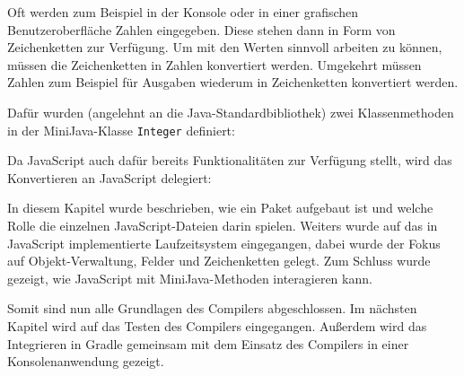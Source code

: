 Oft werden zum Beispiel in der Konsole oder in einer grafischen Benutzeroberfläche Zahlen eingegeben. Diese stehen dann in Form von Zeichenketten zur Verfügung. Um mit den Werten sinnvoll arbeiten zu können, müssen die Zeichenketten in Zahlen konvertiert werden. Umgekehrt müssen Zahlen zum Beispiel für Ausgaben wiederum in Zeichenketten konvertiert werden.

Dafür wurden (angelehnt an die Java-Standardbibliothek) zwei Klassenmethoden in der MiniJava-Klasse \lstinline{Integer} definiert:


Da JavaScript auch dafür bereits Funktionalitäten zur Verfügung stellt, wird das Konvertieren an JavaScript delegiert:


\vspace{4em}
In diesem Kapitel wurde beschrieben, wie ein Paket aufgebaut ist und welche Rolle die einzelnen JavaScript-Dateien darin spielen. Weiters wurde auf das in JavaScript implementierte Laufzeitsystem eingegangen, dabei wurde der Fokus auf Objekt-Verwaltung, Felder und Zeichenketten gelegt. Zum Schluss wurde gezeigt, wie JavaScript mit MiniJava-Methoden interagieren kann.

Somit sind nun alle Grundlagen des Compilers abgeschlossen. Im nächsten Kapitel wird auf das Testen des Compilers eingegangen. Außerdem wird das Integrieren in Gradle gemeinsam mit dem Einsatz des Compilers in einer Konsolenanwendung gezeigt.
